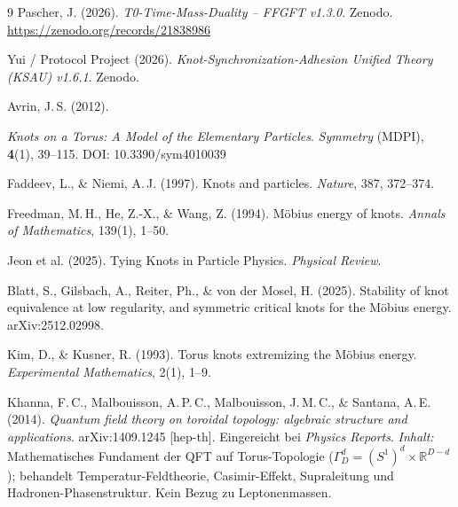 \begin{thebibliography}{9}
Pascher, J. (2026). \emph{T0-Time-Mass-Duality -- FFGFT v1.3.0}.
Zenodo. \url{https://zenodo.org/records/21838986}

Yui / Protocol Project (2026).
\emph{Knot-Synchronization-Adhesion Unified Theory (KSAU) v1.6.1}.
Zenodo.

Avrin, J.\,S. (2012).

\emph{Knots on a Torus: A Model of the Elementary Particles}.
\emph{Symmetry} (MDPI), \textbf{4}(1), 39--115.
DOI: 10.3390/sym4010039

Faddeev, L., \& Niemi, A.\,J. (1997). Knots and particles.
\emph{Nature}, 387, 372--374.

Freedman, M.\,H., He, Z.-X., \& Wang, Z. (1994).
Möbius energy of knots.
\emph{Annals of Mathematics}, 139(1), 1--50.

Jeon et al. (2025). Tying Knots in Particle Physics.
\emph{Physical Review}.

Blatt, S., Gilsbach, A., Reiter, Ph., \& von der Mosel, H. (2025).
Stability of knot equivalence at low regularity, and symmetric critical
knots for the Möbius energy.
arXiv:2512.02998.

Kim, D., \& Kusner, R. (1993).
Torus knots extremizing the Möbius energy.
\emph{Experimental Mathematics}, 2(1), 1--9.

Khanna, F.\,C., Malbouisson, A.\,P.\,C., Malbouisson, J.\,M.\,C., \& Santana, A.\,E. (2014).
\emph{Quantum field theory on toroidal topology: algebraic structure and applications}.
arXiv:1409.1245 [hep-th]. Eingereicht bei \emph{Physics Reports}.
\emph{Inhalt:} Mathematisches Fundament der QFT auf Torus-Topologie ($\Gamma^d_D = (S^1)^d \times \mathbb{R}^{D-d}$); behandelt Temperatur-Feldtheorie, Casimir-Effekt, Supraleitung und Hadronen-Phasenstruktur. Kein Bezug zu Leptonen\-massen.

\end{thebibliography}
